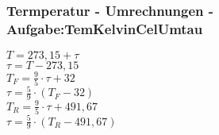 \subsubsection{Termperatur - Umrechnungen - Aufgabe:TemKelvinCelUmtau} 
\begin{minipage}{0.45\textwidth} 
$ T = 273,15 + \tau $\\ 
$ \tau  = T-273,15 $\\ 
$ T_{F}  = \frac{9}{5}\cdot \tau  +32 $\\ 
$ \tau  = \frac{5}{9}\cdot (T_{F}  - 32) $\\ 
$ T_{R}  = \frac{9}{5}\cdot \tau  + 491,67 $\\ 
$ \tau  = \frac{5}{9}\cdot (T_{R}  - 491,67) $\\ 
\end{minipage} 
\begin{minipage}{0.45\textwidth} 
 
\end{minipage} 
